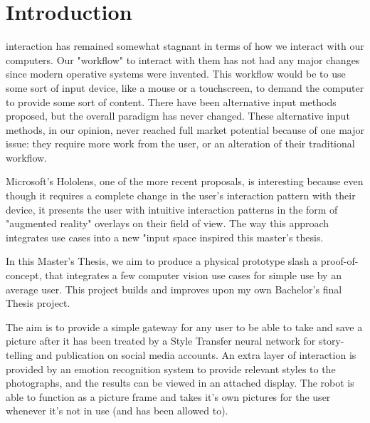 \documentclass[journal,onecolumn]{IEEEtran}
\begin{document}
%
\IEEEpeerreviewmaketitle



\section{Introduction}


 interaction has remained somewhat stagnant in terms of how we interact with our computers. Our "workflow" to interact with them has not had any major changes since modern operative systems were invented. This workflow would be to use some sort of input device, like a mouse or a touchscreen, to demand the computer to provide some sort of content. There have been alternative input methods proposed, but the overall paradigm has never changed. These alternative input methods, in our opinion, never reached full market potential because of one major issue: they require more work from the user, or an alteration of their traditional workflow. 

Microsoft's Hololens\cite{hololens}, one of the more recent proposals, is interesting because even though it requires a complete change in the user's interaction pattern with their device, it presents the user with intuitive interaction patterns in the form of "augmented reality" overlays on their field of view. The way this approach integrates use cases into a new "input space inspired this master's thesis. 

In this Master's Thesis, we aim to produce a physical prototype slash a proof-of-concept, that integrates a few computer vision use cases for simple use by an average user. This project builds and improves upon my own Bachelor's final Thesis project\cite{stanley_duarte}.

The aim is to provide a simple gateway for any user to be able to take and save a picture after it has been treated by a Style Transfer neural network for story-telling and publication on social media accounts. An extra layer of interaction is provided by an emotion recognition system to provide relevant styles to the photographs, and the results can be viewed in an attached display. The robot is able to function as a picture frame and takes it's own pictures for the user whenever it's not in use (and has been allowed to).
\end{document}
